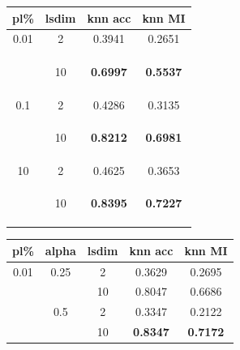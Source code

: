 \documentclass[./dissertation.tex]{subfiles}
\begin{document}
      \begin{table}[]
       \centering
       \begin{tabular}{|c|c|c|c|}
            \hline
            \textbf{pl\%} & \textbf{lsdim} & \textbf{knn acc} & \textbf{knn MI}  \\
            \hline
            0.01 & 2 & 0.3941 & 0.2651 \\
            & & & \\ 
            & & & \\ 
            & & & \\ 
            & 10 & \textbf{0.6997} & \textbf{0.5537} \\ 
            & & & \\ 
            & & & \\ 
            & & & \\ 
            0.1 & 2 & 0.4286 & 0.3135 \\
            & & & \\ 
            & & & \\ 
            & & & \\ 
            & 10 & \textbf{0.8212} & \textbf{0.6981} \\ 
            & & & \\ 
            & & & \\ 
            & & & \\
            10 & 2 & 0.4625 & 0.3653 \\
            & & & \\ 
            & & & \\ 
            & & & \\ 
            & 10 & \textbf{0.8395} & \textbf{0.7227} \\ 
            & & & \\ 
            & & & \\ 
            & & & \\
            \hline
       \end{tabular}
        \begin{tabular}{|c|c|c|c|c|}
            \hline
            \textbf{pl\%} & \textbf{alpha} & \textbf{lsdim} & \textbf{knn acc} & \textbf{knn MI}  \\
            \hline
            0.01 & 0.25 & 2 & 0.3629 & 0.2695 \\
             &  & 10 & 0.8047 & 0.6686 \\
             & 0.5 & 2 & 0.3347 & 0.2122 \\
             &  & 10 & \textbf{0.8347} & \textbf{0.7172} \\

\end{tabular}
\end{table}
\end{document}
